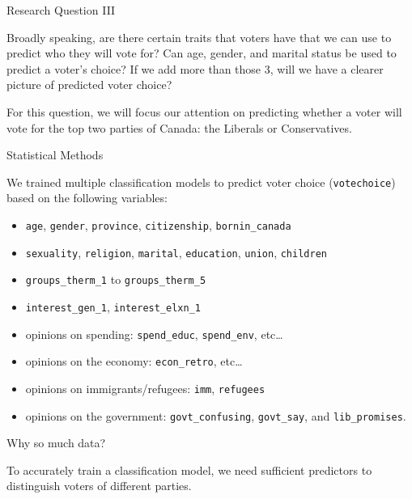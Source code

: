 \documentclass[
  ignorenonframetext,
]{beamer}
\providecommand{\tightlist}{%
  \setlength{\itemsep}{0pt}\setlength{\parskip}{0pt}}
\begin{document}
\begin{frame}{Research Question III}
\protect\hypertarget{research-question-iii}{}

Broadly speaking, are there certain traits that voters have that we can
use to predict who they will vote for? Can age, gender, and marital
status be used to predict a voter's choice? If we add more than those 3,
will we have a clearer picture of predicted voter choice?

For this question, we will focus our attention on predicting whether a
voter will vote for the top two parties of Canada: the Liberals or
Conservatives.

\end{frame}

\begin{frame}[fragile]{Statistical Methods}
\protect\hypertarget{statistical-methods-2}{}

We trained multiple classification models to predict voter choice
(\texttt{votechoice}) based on the following variables:

\begin{itemize}
\tightlist
\item
  \texttt{age}, \texttt{gender}, \texttt{province},
  \texttt{citizenship}, \texttt{bornin\_canada}
\item
  \texttt{sexuality}, \texttt{religion}, \texttt{marital},
  \texttt{education}, \texttt{union}, \texttt{children}
\item
  \texttt{groups\_therm\_1} to \texttt{groups\_therm\_5}
\item
  \texttt{interest\_gen\_1}, \texttt{interest\_elxn\_1}
\item
  opinions on spending: \texttt{spend\_educ}, \texttt{spend\_env},
  etc\ldots{}
\item
  opinions on the economy: \texttt{econ\_retro}, etc\ldots{}
\item
  opinions on immigrants/refugees: \texttt{imm}, \texttt{refugees}
\item
  opinions on the government: \texttt{govt\_confusing},
  \texttt{govt\_say}, and \texttt{lib\_promises}.
\end{itemize}

\begin{block}{Why so much data?}

To accurately train a classification model, we need sufficient
predictors to distinguish voters of different parties.

\end{block}

\end{frame}
\end{document}

